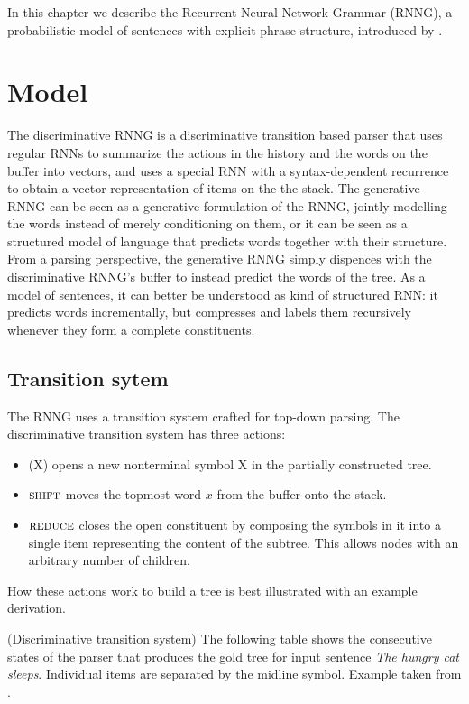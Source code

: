 % 

In this chapter we describe the Recurrent Neural Network Grammar (RNNG), a probabilistic model of sentences with explicit phrase structure, introduced by \citet{dyer2016rnng}.

\section{Model}
The discriminative RNNG is a discriminative transition based parser that uses regular RNNs to summarize the actions in the history and the words on the buffer into vectors, and uses a special RNN with a syntax-dependent recurrence to obtain a vector representation of items on the the stack. The generative RNNG can be seen as a generative formulation of the RNNG, jointly modelling the words instead of merely conditioning on them, or it can be seen as a structured model of language that predicts words together with their structure. From a parsing perspective, the generative RNNG simply dispences with the discriminative RNNG's buffer to instead predict the words of the tree. As a model of sentences, it can better be understood as kind of structured RNN: it predicts words incrementally, but compresses and labels them recursively whenever they form a complete constituents.

\subsection{Transition sytem}
The RNNG uses a transition system crafted for top-down parsing. The discriminative transition system has three actions:
\begin{itemize}
  \item \open(X) opens a new nonterminal symbol X in the partially constructed tree.
  \item $\textsc{shift}$ moves the topmost word $x$ from the buffer onto the stack.
  \item $\textsc{reduce}$ closes the open constituent by composing the symbols in it into a single item representing the content of the subtree. This allows nodes with an arbitrary number of children.
\end{itemize}
How these actions work to build a tree is best illustrated with an example derivation.

\begin{example}{(Discriminative transition system)}
  \label{ex:disc-states}
  The following table shows the consecutive states of the parser that produces the gold tree for input sentence \textit{The hungry cat sleeps}. Individual items are separated by the midline symbol. Example taken from \citet{dyer2016rnng}.
  
\end{example}

